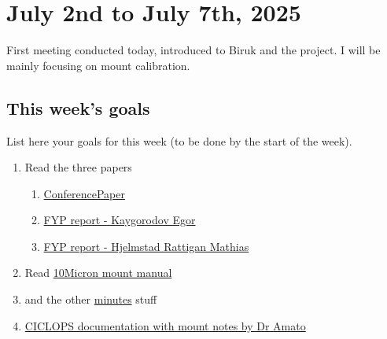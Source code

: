 \documentclass[../main.tex]{subfiles}
\begin{document}
\chapter{July 2nd to July 7th, 2025}
First meeting conducted today, introduced to Biruk and the project. I will be mainly focusing on mount calibration.

\section{This week's goals}
List here your goals for this week (to be done by the start of the week).
\begin{enumerate}
    \item Read the three papers
    \begin{enumerate}
        \item     \href{https://imperiallondon-my.sharepoint.com/personal/damato_ic_ac_uk/Documents/Documents/Students%20and%20collaborators/UROP/UROPs%202024-25/Martin%20Leung/References/Kaygorodov_submitted_250325.pdf?CT=1751483727407&OR=ItemsView}{ConferencePaper}
        \item     \href{https://imperiallondon-my.sharepoint.com/personal/damato_ic_ac_uk/Documents/Documents/Students%20and%20collaborators/UROP/UROPs%202024-25/Martin%20Leung/References/FYP%20report%20-%20Kaygorodov%20Egor.pdf?CT=1751483722224&OR=ItemsView}{FYP report - Kaygorodov Egor}
        \item     \href{https://imperiallondon-my.sharepoint.com/personal/damato_ic_ac_uk/Documents/Documents/Students%20and%20collaborators/UROP/UROPs%202024-25/Martin%20Leung/References/FYP%20report%20-%20Hjelmstad%20Rattigan%20Mathias.pdf?CT=1751483719135&OR=ItemsView}{FYP report - Hjelmstad Rattigan Mathias}
    \end{enumerate}

    \item Read \href{https://imperiallondon-my.sharepoint.com/personal/damato_ic_ac_uk/Documents/Documents/Project%20management/CICLOPS/Documentation/AZ1000HPS-Mount-Manual.pdf?CT=1751488182511&OR=ItemsView}{10Micron mount manual}
    \item and the other \href{https://imperiallondon-my.sharepoint.com/:w:/r/personal/damato_ic_ac_uk/_layouts/15/Doc.aspx?sourcedoc=%7B8D6E4E67-449D-424F-AB04-5AF75790CAC8%7D&file=Martin%20Leung%20-%20Meeting%20notes.docx&action=default&mobileredirect=true}{minutes} stuff
    \item \href{https://imperiallondon-my.sharepoint.com/personal/damato_ic_ac_uk/_layouts/15/onedrive.aspx?id=%2Fpersonal%2Fdamato%5Fic%5Fac%5Fuk%2FDocuments%2FDocuments%2FProject%20management%2FCICLOPS%2FDocumentation&CT=1751483599340&OR=OWA%2DNT%2DMail&CID=a9e9192b%2D8bd2%2D9e4f%2Db0e7%2D1bfa1679f5b3&e=5%3A37a1453353a044b38a1eb021c49fdaa6&sharingv2=true&fromShare=true&at=9&FolderCTID=0x012000A0D128FDFD328A43BB09E3D870B16404&view=0}{CICLOPS documentation with mount notes by Dr Amato}
\end{enumerate}
\end{document}
